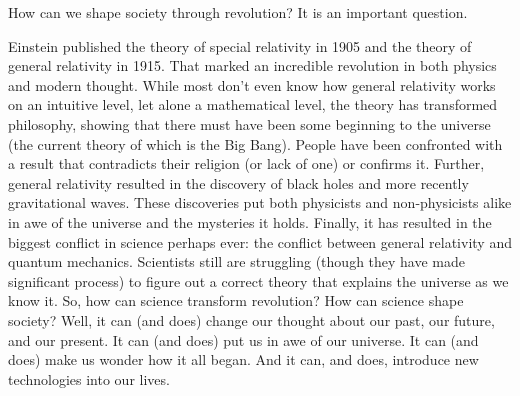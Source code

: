 How can we shape society through revolution? It is an important question.

Einstein published the theory of special relativity in 1905 and the theory of general relativity in 1915. 
That marked an incredible revolution in both physics and modern thought. 
While most don't even know how general relativity works on an intuitive level, let alone a mathematical level, 
the theory has transformed philosophy, showing that there must have been some beginning to the universe 
(the current theory of which is the Big Bang). 
People have been confronted with a result that contradicts their religion (or lack of one) or confirms it. 
Further, general relativity resulted in the discovery of black holes and more recently gravitational waves. 
These discoveries put both physicists and non-physicists alike in awe of the universe and the mysteries it holds. 
Finally, it has resulted in the biggest conflict in science perhaps ever: the conflict between general relativity and quantum mechanics. 
Scientists still are struggling (though they have made significant process) to figure out a correct theory 
that explains the universe as we know it. So, how can science transform revolution? How can science shape society?
Well, it can (and does) change our thought about our past, our future, and our present. 
It can (and does) put us in awe of our universe. It can (and does) make us wonder how it all began. 
And it can, and does, introduce new technologies into our lives.
